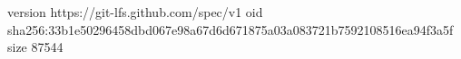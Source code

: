version https://git-lfs.github.com/spec/v1
oid sha256:33b1e50296458dbd067e98a67d6d671875a03a083721b7592108516ea94f3a5f
size 87544
